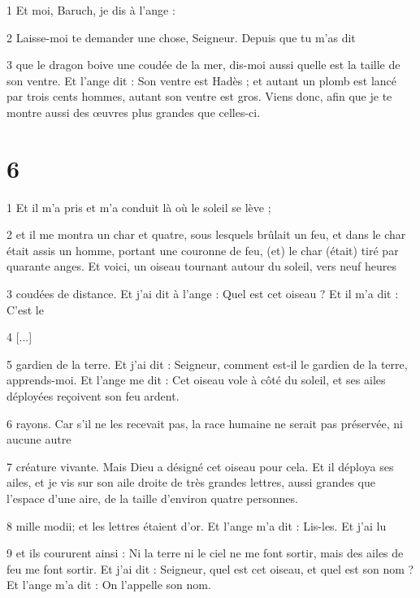 \par 1 Et moi, Baruch, je dis à l'ange :

\par 2 Laisse-moi te demander une chose, Seigneur. Depuis que tu m'as dit

\par 3 que le dragon boive une coudée de la mer, dis-moi aussi quelle est la taille de son ventre. Et l'ange dit : Son ventre est Hadès ; et autant un plomb est lancé par trois cents hommes, autant son ventre est gros. Viens donc, afin que je te montre aussi des œuvres plus grandes que celles-ci.

\chapter{6}

\par 1 Et il m'a pris et m'a conduit là où le soleil se lève ;

\par 2 et il me montra un char et quatre, sous lesquels brûlait un feu, et dans le char était assis un homme, portant une couronne de feu, (et) le char (était) tiré par quarante anges. Et voici, un oiseau tournant autour du soleil, vers neuf heures

\par 3 coudées de distance. Et j'ai dit à l'ange : Quel est cet oiseau ? Et il m'a dit : C'est le

\par 4 [...]

\par 5 gardien de la terre. Et j'ai dit : Seigneur, comment est-il le gardien de la terre, apprends-moi. Et l'ange me dit : Cet oiseau vole à côté du soleil, et ses ailes déployées reçoivent son feu ardent.

\par 6 rayons. Car s'il ne les recevait pas, la race humaine ne serait pas préservée, ni aucune autre

\par 7 créature vivante. Mais Dieu a désigné cet oiseau pour cela. Et il déploya ses ailes, et je vis sur son aile droite de très grandes lettres, aussi grandes que l'espace d'une aire, de la taille d'environ quatre personnes.

\par 8 mille modii; et les lettres étaient d'or. Et l'ange m'a dit : Lis-les. Et j'ai lu

\par 9 et ils coururent ainsi : Ni la terre ni le ciel ne me font sortir, mais des ailes de feu me font sortir. Et j'ai dit : Seigneur, quel est cet oiseau, et quel est son nom ? Et l'ange m'a dit : On l'appelle son nom.


